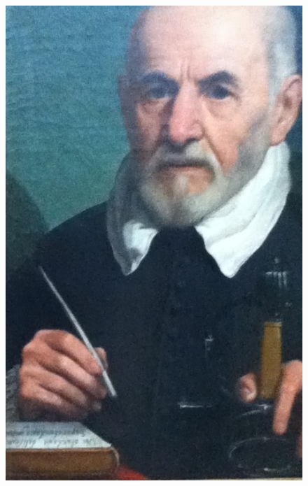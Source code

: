 \begin{figure}
\begin{minipage}[c]{.32\linewidth}
    \includegraphics[width=\textwidth]{figures/1C-0.JPG}
  \end{minipage}
  

\end{figure}
